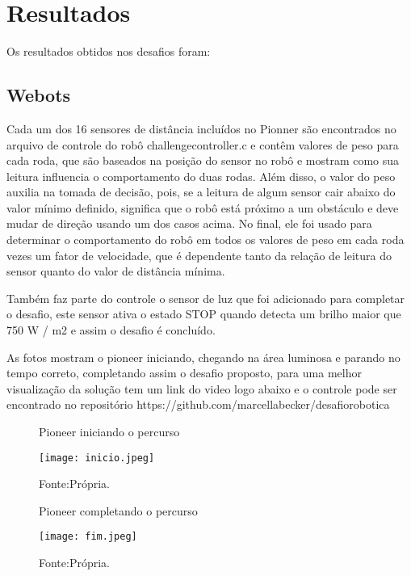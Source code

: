 \chapter{Resultados}

\label{chap:result}
Os resultados obtidos nos desafios foram:
\section{Webots}

Cada um dos 16 sensores de distância incluídos no Pionner são encontrados no arquivo de controle do robô challengecontroller.c
e contêm valores de peso para cada roda, que são baseados na posição do sensor no robô e mostram como sua leitura influencia o 
comportamento do duas rodas. Além disso, o valor do peso auxilia na tomada de decisão, pois, se a leitura de algum sensor cair 
abaixo do valor mínimo definido, significa que o robô está próximo a um obstáculo e deve mudar de direção usando um dos casos acima. 
No final, ele foi usado para determinar o comportamento do robô em todos os valores de peso em cada roda vezes um fator de velocidade, 
que é dependente tanto da relação de leitura do sensor quanto do valor de distância mínima.

Também faz parte do controle o sensor de luz que foi adicionado para completar o desafio, 
este sensor ativa o estado STOP quando detecta um brilho maior que 750 W / m2 e assim o desafio é concluído.

As fotos mostram o pioneer iniciando, chegando na área luminosa e parando no tempo correto, completando assim o desafio proposto,
para uma melhor visualização da solução tem um link do video logo abaixo e o controle pode ser encontrado no repositório https://github.com/marcellabecker/desafiorobotica 

\begin{figure} [h!]	
    \centering
    \caption{Pioneer iniciando o percurso}
    \texttt{[image: inicio.jpeg]}
    \caption*{Fonte:Própria.}
    \label{fig:inciodopercurso}
\end{figure}

\begin{figure} [h!]	
    \centering
    \caption{Pioneer completando o percurso}
    \texttt{[image: fim.jpeg]}
    \caption*{Fonte:Própria.}
    \label{fig:fimdopercurso}
\end{figure}



